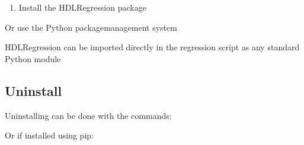 \documentclass[letterpaper,10pt,english]{sphinxmanual}
\begin{document}
\begin{sphinxVerbatim}[commandchars=\\\{\}]
\end{sphinxVerbatim}
\begin{enumerate}
%
\setcounter{enumi}{1}
\item {} 
\sphinxAtStartPar
Install the HDLRegression package

\end{enumerate}

\begin{sphinxVerbatim}[commandchars=\\\{\}]
\end{sphinxVerbatim}

\sphinxAtStartPar
Or use the Python package\sphinxhyphen{}management system

\begin{sphinxVerbatim}[commandchars=\\\{\}]
\end{sphinxVerbatim}

\sphinxAtStartPar
HDLRegression can be imported directly in the regression script as any standard Python module

\begin{sphinxVerbatim}[commandchars=\\\{\}]
 
\end{sphinxVerbatim}


\subsection{Uninstall}
\label{\detokenize{intro:uninstall}}
\sphinxAtStartPar
Uninstalling can be done with the commands:

\begin{sphinxVerbatim}[commandchars=\\\{\}]
\end{sphinxVerbatim}

\sphinxAtStartPar
Or if installed using pip:

\begin{sphinxVerbatim}[commandchars=\\\{\}]
\end{sphinxVerbatim}
\end{document}
